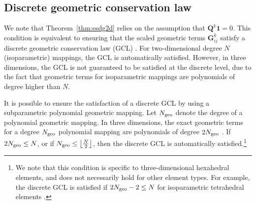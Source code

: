 \documentclass[review,onefignum,onetabnum,final]{siamart171218}
\begin{document}
\subsection{Discrete geometric conservation law}

We note that Theorem~\ref{thm:esdg2d} relies on the assumption that $\bm{Q}^k\bm{1} = 0$.  This condition is equivalent to ensuring that the scaled geometric terms ${\bm{G}}^k_{ij}$ satisfy a discrete geometric conservation law (GCL) \cite{carpenter2014entropy, gassner2017br1, crean2018entropy, chan2018discretely}.  For two-dimensional degree $N$ (isoparametric) mappings, the GCL is automatically satisfied.  However, in three dimensions, the GCL is not guaranteed to be satisfied at the discrete level, due to the fact that geometric terms for isoparametric mappings are polynomials of degree higher than $N$.  

It is possible to ensure the satisfaction of a discrete GCL by using a subparametric polynomial geometric mapping.  Let $N_{\rm geo}$ denote the degree of a polynomial geometric mapping.  In three dimensions, the exact geometric terms for a degree $N_{\rm geo}$ polynomial mapping are polynomials of degree $2N_{\rm geo}$ \cite{kopriva2006metric, hindenlang2012explicit, crean2018entropy}.  If $2N_{\rm geo} \leq N$, or if $N_{\rm geo} \leq \left\lfloor\frac{N}{2}\right\rfloor$, then the discrete GCL is automatically satisfied.\footnote{We note that this condition is specific to three-dimensional hexahedral elements, and does not necessarily hold for other element types.  For example, the discrete GCL is satisfied if $2N_{\rm geo}-2 \leq N$ for isoparametric tetrahedral elements \cite{chan2018discretely}.}
\end{document}
